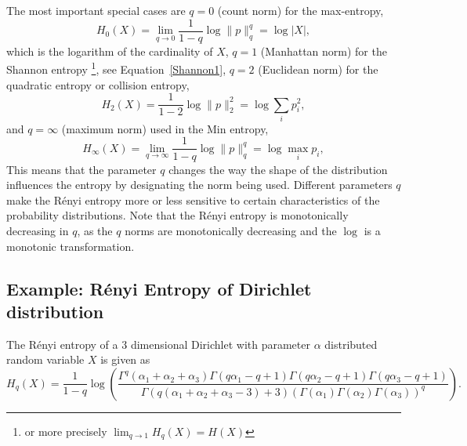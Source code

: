 \documentclass[12pt, twoside]{article}
\newcommand{\1}{\mathbb{1}}
\begin{document}
The most important special cases are $q = 0$ (count norm) for the max-entropy,
$$ 
H_0(X) = \lim_{q \to 0} \frac{1}{1 - q} \log \| p \|_q^q =  \log |X|,
$$
which is the logarithm of the cardinality of $X$,
$ q = 1 $ (Manhattan norm) for the Shannon entropy \footnote{or more precisely $\lim_{q \to 1} H_q(X) = H(X)$}, see Equation~\eqref{Shannon1},  $ q = 2 $ (Euclidean norm)  for the quadratic entropy or collision entropy, 
$$ 
H_2(X) = \frac{1}{1 - 2} \log \| p \|_2^2 = \log \sum_{i} p_i^2,
$$
and $q = \infty$ (maximum norm) used in the Min entropy,
$$ 
H_\infty(X) = \lim_{q \to \infty} \frac{1}{1 - q} \log \| p \|_q^q = \log \max_{i} p_i,
$$
This means that the parameter $ q $ changes the way the shape of the distribution influences the entropy by designating the norm being used. Different parameters $q$ make the R\'enyi entropy more or less sensitive to certain characteristics of the probability distributions.
Note that the R\'enyi  entropy is monotonically decreasing in $q$, as the $q$ norms are monotonically decreasing and the $\log$ is a monotonic transformation. 

\subsection{Example: R\'enyi Entropy of Dirichlet distribution}\label{ex:dirichlet_entropy}
The R\'enyi entropy of a $3$ dimensional Dirichlet with parameter $\alpha$ distributed random variable $X$ is given as
$$H_q(X) = \frac{1}{1 - q} \log(\frac{\Gamma^q(\alpha_1 + \alpha_2 + \alpha_3) \Gamma(q \alpha_1 - q + 1) \Gamma(q \alpha_2 - q + 1) \Gamma(q \alpha_3 - q + 1)}{\Gamma(q (\alpha_1 + \alpha_2 + \alpha_3 - 3) + 3) (\Gamma(\alpha_1) \Gamma(\alpha_2) \Gamma(\alpha_3))^q}).$$
\end{document}
